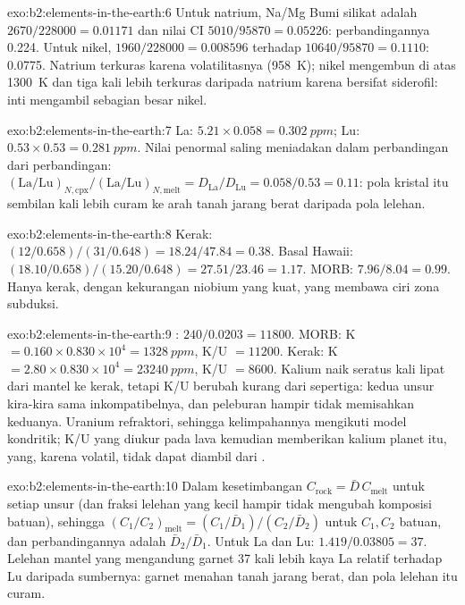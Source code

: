 \begin{solution}{exo:b2:elements-in-the-earth:6}
Untuk natrium, Na/Mg Bumi silikat adalah $2670/\num{228000} = 0.01171$ dan nilai CI
$5010/\num{95870} = 0.05226$: perbandingannya 0.224. Untuk nikel, $1960/\num{228000}
= 0.008596$ terhadap $\num{10640}/\num{95870} = 0.1110$: 0.0775. Natrium
terkuras karena volatilitasnya (\qty{958}{K}); nikel mengembun di atas \qty{1300}{K} dan
tiga kali lebih terkuras daripada natrium karena bersifat siderofil: inti mengambil sebagian besar
nikel.
\end{solution}

\begin{solution}{exo:b2:elements-in-the-earth:7}
La: $5.21\times0.058 = \qty{0.302}{ppm}$; Lu: $0.53\times0.53 = \qty{0.281}{ppm}$. Nilai
penormal saling meniadakan dalam perbandingan dari perbandingan:
$(\mathrm{La}/\mathrm{Lu})_{N,\mathrm{cpx}}/(\mathrm{La}/\mathrm{Lu})_{N,\mathrm{melt}} =
D_{\mathrm{La}}/D_{\mathrm{Lu}} = 0.058/0.53 = 0.11$: pola kristal itu sembilan
kali lebih curam ke arah tanah jarang berat daripada pola lelehan.
\end{solution}

\begin{solution}{exo:b2:elements-in-the-earth:8}
Kerak: $(12/0.658)/(31/0.648) = 18.24/47.84 = 0.38$. Basal Hawaii:
$(18.10/0.658)/(15.20/0.648) = 27.51/23.46 = 1.17$. MORB: $7.96/8.04 = 0.99$. Hanya
kerak, dengan kekurangan niobium yang kuat, yang membawa ciri zona subduksi.
\end{solution}

\begin{solution}{exo:b2:elements-in-the-earth:9}
: $240/0.0203 = \num{11800}$. MORB: K $= 0.160\times0.830\times10^4 =
\qty{1328}{ppm}$, K/U $= \num{11200}$. Kerak: K $= 2.80\times0.830\times10^4 =
\qty{23240}{ppm}$, K/U $= \num{8600}$. Kalium naik seratus kali lipat dari mantel ke kerak,
tetapi K/U berubah kurang dari sepertiga: kedua unsur kira-kira sama inkompatibelnya,
dan peleburan hampir tidak memisahkan keduanya. Uranium refraktori, sehingga kelimpahannya mengikuti
model kondritik; K/U yang diukur pada lava kemudian memberikan kalium planet itu, yang,
karena volatil, tidak dapat diambil dari .
\end{solution}

\begin{solution}{exo:b2:elements-in-the-earth:10}
Dalam kesetimbangan $C_{\mathrm{rock}} = \bar D\,C_{\mathrm{melt}}$ untuk setiap unsur (dan
fraksi lelehan yang kecil hampir tidak mengubah komposisi batuan), sehingga
$(C_1/C_2)_{\mathrm{melt}} = (C_{1}/\bar D_1)/(C_{2}/\bar D_2)$ untuk $C_1,
C_2$ batuan, dan perbandingannya adalah $\bar D_2/\bar D_1$. Untuk La dan Lu: $1.419/0.03805 = 37$. Lelehan
mantel yang mengandung garnet 37 kali lebih kaya La relatif terhadap Lu daripada sumbernya: garnet
menahan tanah jarang berat, dan pola lelehan itu curam.
\end{solution}

